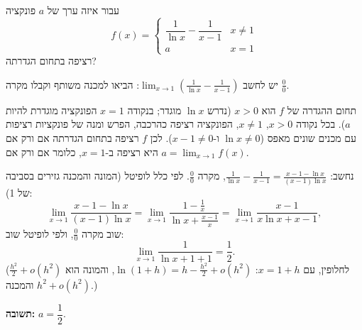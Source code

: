 
\begin{question}
עבור איזה ערך של $a$ פונקציה
\[ f(x)=\begin{cases} \dfrac{1}{\ln x}-\dfrac{1}{x-1} & x\neq 1\\[2mm] a & x=1\end{cases} \]
רציפה בתחום הגדרתה?
\end{question}

\begin{hint}
יש לחשב $\lim_{x\to1}\left(\frac{1}{\ln x}-\frac{1}{x-1}\right)$: הביאו למכנה משותף וקבלו מקרה $\frac00$.
\end{hint}

\begin{solution}
תחום ההגדרה של $f$ הוא $x>0$ (נדרש $\ln x$ מוגדר; בנקודה $x=1$ הפונקציה מוגדרת להיות $a$). בכל נקודה $x>0$, $x\ne1$, הפונקציה רציפה כהרכבה, הפרש ומנה של פונקציות רציפות עם מכנים שונים מאפס ($\ln x\ne0$ ו-$x-1\ne0$). לכן $f$ רציפה בתחום הגדרתה אם ורק אם היא רציפה ב-$x=1$, כלומר אם ורק אם $a=\lim_{x\to1}f(x)$.

נחשב: $\displaystyle \frac{1}{\ln x}-\frac{1}{x-1} = \frac{x-1-\ln x}{(x-1)\ln x}$, מקרה $\frac{0}{0}$. לפי כלל לופיטל (המונה והמכנה גזירים בסביבה של 1):
\[ \lim_{x\to1}\frac{x-1-\ln x}{(x-1)\ln x} = \lim_{x\to1}\frac{1-\frac1x}{\ln x+\frac{x-1}{x}} = \lim_{x\to1}\frac{x-1}{x\ln x + x-1}, \]
שוב מקרה $\frac00$, ולפי לופיטל שוב:
\[ \lim_{x\to1}\frac{1}{\ln x + 1 + 1} = \frac{1}{2}. \]
(לחלופין, עם $x=1+h$: $\ln(1+h)=h-\frac{h^2}{2}+o(h^2)$, והמונה הוא $\frac{h^2}{2}+o(h^2)$ והמכנה $h^2+o(h^2)$.)

\textbf{תשובה:} $a=\dfrac12$.
\end{solution}
